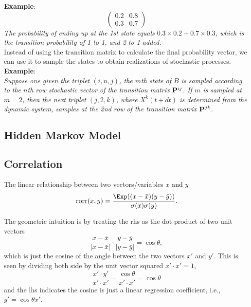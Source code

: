 {\bf Example}: \\
{\emph{ 
\begin{equation}
  [0.3 0.7] \begin{pmatrix} 0.2 & 0.8 \\ 0.3 & 0.7 \end{pmatrix}
\end{equation}
The probability of ending up at the 1st state equals $0.3\times0.2 + 0.7\times0.3$, which is the transition probability of 1 to 1, and 2 to 1 added.
}}
\\

Instead of using the transition matrix to calculate the final probability vector, we can use it to sample the states to obtain realizations of stochastic processes. \\
{\bf Example}: \\
{\emph{
Suppose one given the triplet $(i,n,j)$, the $m$th state of $B$ is sampled according to the $n$th row stochastic vector of the transition matrix ${\bf P}^{ij}$. 
If $m$ is sampled at $m=2$, then the next triplet $(j,2,k)$, where $X^k(t+dt)$ is determined from the dynamic system, samples at the 2nd row of the transition matrix ${\bf P}^{jk}$.
}}

\subsection{Hidden Markov Model}


\subsection{Correlation}
\begin{defn*}
The linear relationship between two vectors/variables $x$ and $y$
\begin{equation}
   \text{corr}(x,y) = \frac{\Exp((x-\bar{x})(y-\bar{y}))}{\sigma(x)\sigma(y)}.
\end{equation}
\end{defn*}
\begin{derv*}
The geometric intuition is by treating the rhs as the dot product of two unit vectors
\begin{equation}
   \frac{x-\bar{x}}{|x-\bar{x}|} \cdot \frac{y-\bar{y}}{|y-\bar{y}|} = \cos \theta,
\end{equation}
which is just the cosine of the angle between the two vectors $x'$ and $y'$. This is seen by
dividing both side by the unit vector squared $x' \cdot x' = 1$,  
\begin{equation}
   \frac{x' \cdot y'}{x' \cdot x'} = \frac{\cos \theta}{x' \cdot x'} = \cos \theta
\end{equation}
and the lhs indicates the cosine is just a linear regression coefficient, i.e., $y' = \cos \theta x'$.
\end{derv*}








